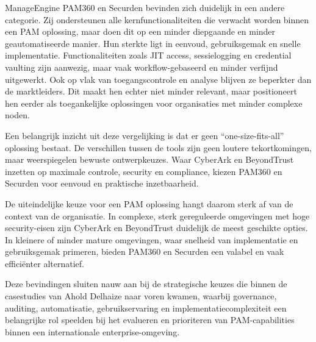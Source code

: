 ManageEngine PAM360 en Securden bevinden zich duidelijk in een andere categorie. Zij ondersteunen alle kernfunctionaliteiten die verwacht worden binnen een PAM oplossing, maar doen dit op een minder diepgaande en minder geautomatiseerde manier. Hun sterkte ligt in eenvoud, gebruiksgemak en snelle implementatie. Functionaliteiten zoals JIT access, sessielogging en credential vaulting zijn aanwezig, maar vaak workflow-gebaseerd en minder verfijnd uitgewerkt. Ook op vlak van toegangscontrole en analyse blijven ze beperkter dan de marktleiders. Dit maakt hen echter niet minder relevant, maar positioneert hen eerder als toegankelijke oplossingen voor organisaties met minder complexe noden.

Een belangrijk inzicht uit deze vergelijking is dat er geen “one-size-fits-all” oplossing bestaat. De verschillen tussen de tools zijn geen loutere tekortkomingen, maar weerspiegelen bewuste ontwerpkeuzes. Waar CyberArk en BeyondTrust inzetten op maximale controle, security en compliance, kiezen PAM360 en Securden voor eenvoud en praktische inzetbaarheid.

De uiteindelijke keuze voor een PAM oplossing hangt daarom sterk af van de context van de organisatie. In complexe, sterk gereguleerde omgevingen met hoge security-eisen zijn CyberArk en BeyondTrust duidelijk de meest geschikte opties. In kleinere of minder mature omgevingen, waar snelheid van implementatie en gebruiksgemak primeren, bieden PAM360 en Securden een valabel en vaak efficiënter alternatief.

Deze bevindingen sluiten nauw aan bij de strategische keuzes die binnen de casestudies van Ahold Delhaize naar voren kwamen, waarbij governance, auditing, automatisatie, gebruikservaring en implementatiecomplexiteit een belangrijke rol speelden bij het evalueren en prioriteren van PAM-capabilities binnen een internationale enterprise-omgeving.



